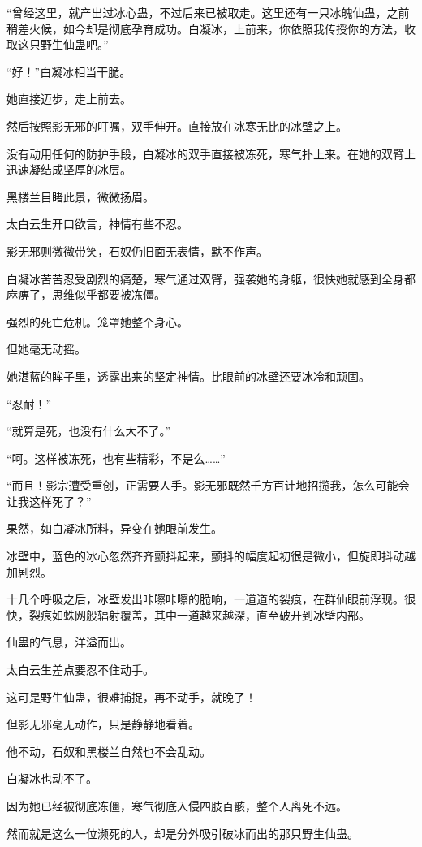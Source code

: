 \begin{this_body}
“曾经这里，就产出过冰心蛊，不过后来已被取走。这里还有一只冰魄仙蛊，之前稍差火候，如今却是彻底孕育成功。白凝冰，上前来，你依照我传授你的方法，收取这只野生仙蛊吧。”

“好！”白凝冰相当干脆。

她直接迈步，走上前去。

然后按照影无邪的叮嘱，双手伸开。直接放在冰寒无比的冰壁之上。

没有动用任何的防护手段，白凝冰的双手直接被冻死，寒气扑上来。在她的双臂上迅速凝结成坚厚的冰层。

黑楼兰目睹此景，微微扬眉。

太白云生开口欲言，神情有些不忍。

影无邪则微微带笑，石奴仍旧面无表情，默不作声。

白凝冰苦苦忍受剧烈的痛楚，寒气通过双臂，强袭她的身躯，很快她就感到全身都麻痹了，思维似乎都要被冻僵。

强烈的死亡危机。笼罩她整个身心。

但她毫无动摇。

她湛蓝的眸子里，透露出来的坚定神情。比眼前的冰壁还要冰冷和顽固。

“忍耐！”

“就算是死，也没有什么大不了。”

“呵。这样被冻死，也有些精彩，不是么……”

“而且！影宗遭受重创，正需要人手。影无邪既然千方百计地招揽我，怎么可能会让我这样死了？”

果然，如白凝冰所料，异变在她眼前发生。

冰壁中，蓝色的冰心忽然齐齐颤抖起来，颤抖的幅度起初很是微小，但旋即抖动越加剧烈。

十几个呼吸之后，冰壁发出咔嚓咔嚓的脆响，一道道的裂痕，在群仙眼前浮现。很快，裂痕如蛛网般辐射覆盖，其中一道越来越深，直至破开到冰壁内部。

仙蛊的气息，洋溢而出。

太白云生差点要忍不住动手。

这可是野生仙蛊，很难捕捉，再不动手，就晚了！

但影无邪毫无动作，只是静静地看着。

他不动，石奴和黑楼兰自然也不会乱动。

白凝冰也动不了。

因为她已经被彻底冻僵，寒气彻底入侵四肢百骸，整个人离死不远。

然而就是这么一位濒死的人，却是分外吸引破冰而出的那只野生仙蛊。


\end{this_body}
